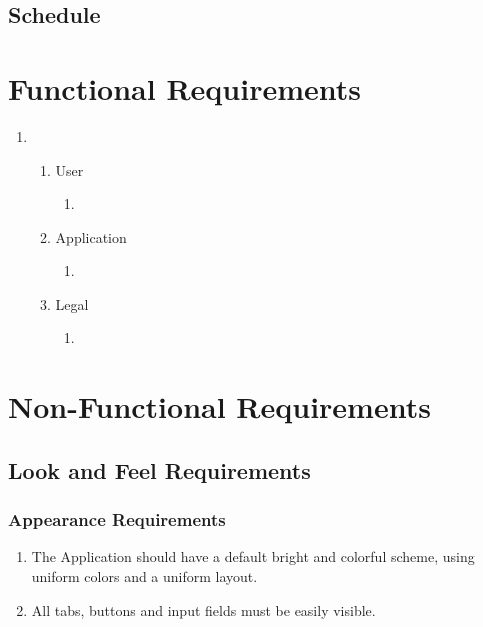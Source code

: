 \documentclass[english]{article}
\begin{document}
\subsection{Schedule} 



\color{black}
\section{Functional Requirements}
\label{sec:functional_requirements}

\begin{enumerate}[{BE}1.]
	\item 
	\begin{enumerate}[{VP1}.1]
		\item User
			\begin{enumerate}
				\item 
		         \end{enumerate}
		\item Application 
			\begin{enumerate}
				\item 
			\end{enumerate}
		\item Legal
			\begin{enumerate}
				\item 
			\end{enumerate}
	\end{enumerate}

	
\end{enumerate}



\section{Non-Functional Requirements}
\label{sec:non-functional_requirements}
\subsection{Look and Feel Requirements}
\label{sub:look_and_feel_requirements}

\subsubsection{Appearance Requirements}
\label{ssub:appearance_requirements}
\begin{enumerate}[{AR}1. ] 

\item The Application should have a default bright and colorful scheme, using uniform colors and a uniform layout.

\item All tabs, buttons and input fields must be easily visible.


\end{enumerate}
\end{document}
